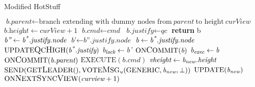 \begin{algorithm}[h!]
	\caption{Modified HotStuff}\label{hotstuffalgorithm}
	\begin{algorithmic}[1]
	 \label{code_createleaf}
		\color{Magenta}
		\State $\textit{b.parent} \gets \text{branch extending with dummy nodes from}\ \textit{parent}\ \text{to height}\ \textit{curView}$
		\State $\textit{b.height} \gets \textit{curView} + 1$
		\color{black}
		\State $\textit{b.cmd} \gets \textit{cmd}$
		\State $\textit{b.justify} \gets \textit{qc}$
		\State \textbf{return} b
	\EndFunction
		\State $\textit{b''} \gets \textit{b\textsuperscript{*}.justify.node}$
		\State $\textit{b'} \gets \textit{b''.justify.node}$
		\State $\textit{b} \gets \textit{b\textsuperscript{*}.justify.node}$
		\State $\text{UPDATE{\large Q}C{\large H}IGH}(\textit{b\textsuperscript{*}.justify})$
			\State $\textit{b\textsubscript{lock}} \gets \textit{b'}$
		\EndIf
			\State $\text{ON{\large C}OMMIT}(\textit{b})$
			\State $\textit{b\textsubscript{exec}} \gets \textit{b}$
		\EndIf
	\EndProcedure
			\State $\text{ON{\large C}OMMIT}(\textit{b.parent})$
			\State $\text{EXECUTE}(\textit{b.cmd})$
		\EndIf
	\EndProcedure
	 \label{code_onreceiveproposal}
		\color{Green}
		 \label{code_checkview}
			\color{black}
				\State $\textit{vheight} \gets \textit{b\textsubscript{new}.height}$
				\State $ \text{SEND}(\text{GET{\large L}EADER}(), \text{VOTE{\large M}SG}\textsubscript{\textit{u}}(\text{GENERIC}, \textit{b\textsubscript{new}}, \bot))$
			\EndIf
			\State $\text{UPDATE}(\textit{b\textsubscript{new}})$
			\color{Green}
			 \label{code_proposaltransition}
				\State $\text{ON{\large N}EXT{\large S}YNC{\large V}IEW}(\textit{curview} + 1)$

\end{algorithmic}
\end{algorithm}
